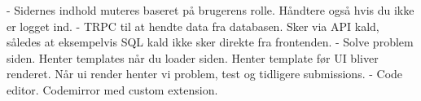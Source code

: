 


- Sidernes indhold muteres baseret på brugerens rolle. Håndtere også hvis du ikke er logget ind.
- TRPC til at hendte data fra databasen. Sker via API kald, således at eksempelvis SQL kald ikke sker direkte fra frontenden.
- Solve problem siden. Henter templates når du loader siden. Henter template før UI bliver renderet. Når ui render henter vi problem, test og tidligere submissions.
- Code editor. Codemirror med custom extension.
